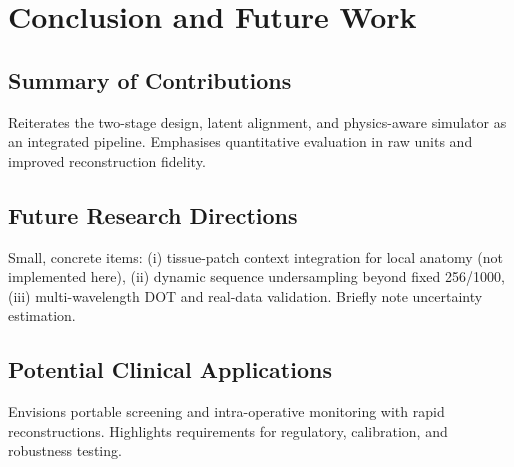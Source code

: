 
\chapter{Conclusion and Future Work}

\section{Summary of Contributions}

Reiterates the two-stage design, latent alignment, and physics-aware simulator as an integrated pipeline. Emphasises quantitative evaluation in raw units and improved reconstruction fidelity.


\section{Future Research Directions}

Small, concrete items: (i) tissue-patch context integration for local anatomy (not implemented here), (ii) dynamic sequence undersampling beyond fixed 256/1000, (iii) multi-wavelength DOT and real-data validation. Briefly note uncertainty estimation.


\section{Potential Clinical Applications}

Envisions portable screening and intra-operative monitoring with rapid reconstructions. Highlights requirements for regulatory, calibration, and robustness testing.


